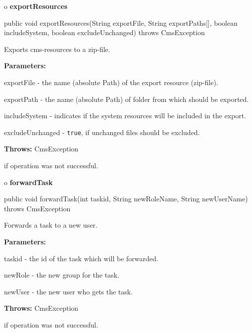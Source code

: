 o {\bf exportResources} 

\begin{PRE}
 public void exportResources(String exportFile,
                             String exportPaths[],
                             boolean includeSystem,
                             boolean excludeUnchanged) throws CmsException
\end{PRE}

\begin{description}
\htmlDD Exports cms-resources to a zip-file. 

\begin{description}
\item {\bf Parameters:}  

exportFile - the name (absolute Path) of the export resource (zip-file).  

exportPath - the name (absolute Path) of folder from which should be exported.
 

includeSystem - indicates if the system resources will be included in the
export.  

excludeUnchanged - {\tt true}, if unchanged files should be excluded.  
\item {\bf Throws:} CmsException  

if operation was not successful.  
\end{description}

\end{description}

o {\bf forwardTask} 

\begin{PRE}
 public void forwardTask(int taskid,
                         String newRoleName,
                         String newUserName) throws CmsException
\end{PRE}

\begin{description}
\htmlDD Forwards a task to a new user. 

\begin{description}
\item {\bf Parameters:}  

taskid - the id of the task which will be forwarded.  

newRole - the new group for the task.  

newUser - the new user who gets the task.  
\item {\bf Throws:} CmsException  

if operation was not successful.  
\end{description}

\end{description}

